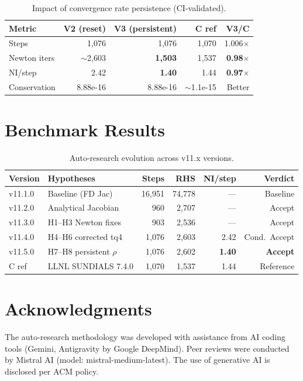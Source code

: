 \documentclass[manuscript,screen,review]{acmart}
\begin{document}
\begin{table}[h]
\caption{Impact of convergence rate persistence (CI-validated).}
\label{tab:results}
\begin{tabular}{lrrrr}
\toprule
\textbf{Metric} & \textbf{V2 (reset)} & \textbf{V3 (persistent)} & \textbf{C ref} & \textbf{V3/C} \\
\midrule
Steps           & 1,076 & 1,076 & 1,070 & 1.006$\times$ \\
Newton iters    & $\sim$2,603 & \textbf{1,503} & 1,537 & \textbf{0.98$\times$} \\
NI/step         & 2.42 & \textbf{1.40} & 1.44 & \textbf{0.97$\times$} \\
Conservation    & 8.88e-16 & 8.88e-16 & $\sim$1.1e-15 & Better \\
\bottomrule
\end{tabular}
\end{table}

\section{Benchmark Results}

\begin{table}[h]
\caption{Auto-research evolution across v11.x versions.}
\label{tab:evolution}
\begin{tabular}{llrrrr}
\toprule
\textbf{Version} & \textbf{Hypotheses} & \textbf{Steps} & \textbf{RHS} & \textbf{NI/step} & \textbf{Verdict} \\
\midrule
v11.1.0 & Baseline (FD Jac)    & 16,951 & 74,778 & ---  & Baseline \\
v11.2.0 & Analytical Jacobian  & 960    & 2,707  & ---  & Accept \\
v11.3.0 & H1--H3 Newton fixes  & 903    & 2,536  & ---  & Accept \\
v11.4.0 & H4--H6 corrected tq4 & 1,076  & 2,603  & 2.42 & Cond.\ Accept \\
v11.5.0 & H7--H8 persistent $\rho$ & 1,076 & 2,602 & \textbf{1.40} & \textbf{Accept} \\
\midrule
C ref   & LLNL SUNDIALS 7.4.0  & 1,070  & 1,537  & 1.44 & Reference \\
\bottomrule
\end{tabular}
\end{table}

\section*{Acknowledgments}
The auto-research methodology was developed with assistance from AI coding tools (Gemini, Antigravity by Google DeepMind). Peer reviews were conducted by Mistral AI (model: mistral-medium-latest). The use of generative AI is disclosed per ACM policy.
\end{document}
